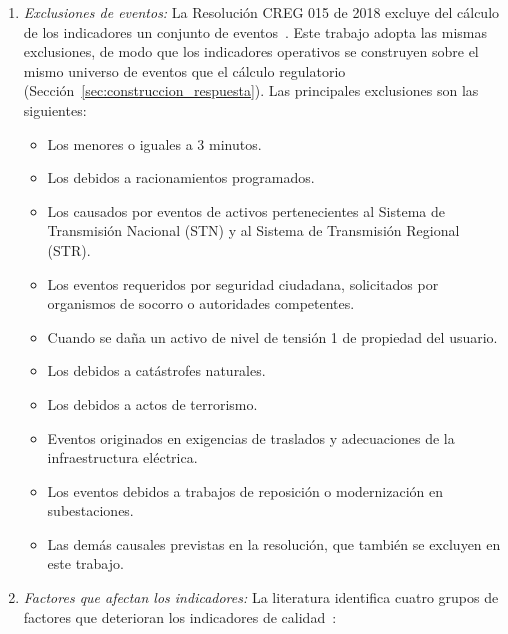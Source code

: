 \begin{enumerate}
          \item \textit{Exclusiones de eventos:}
          La Resolución CREG 015 de 2018 excluye del cálculo de los indicadores un conjunto de eventos~\cite{ref1}. Este trabajo adopta las mismas exclusiones, de modo que los indicadores operativos se construyen sobre el mismo universo de eventos que el cálculo regulatorio (Sección~\ref{sec:construccion_respuesta}). Las principales exclusiones son las siguientes:
            \begin{itemize}
                \item Los menores o iguales a 3 minutos.
                \item Los debidos a racionamientos programados.
                \item Los causados por eventos de activos pertenecientes al Sistema de Transmisión Nacional (STN) y al Sistema de Transmisión Regional (STR).
                \item Los eventos requeridos por seguridad ciudadana, solicitados por organismos de socorro o autoridades competentes.
                \item Cuando se daña un activo de nivel de tensión 1 de propiedad del usuario.
                \item Los debidos a catástrofes naturales.
                \item Los debidos a actos de terrorismo.
                \item Eventos originados en exigencias de traslados y adecuaciones de la infraestructura eléctrica.
                \item Los eventos debidos a trabajos de reposición o modernización en subestaciones.
                \item Las demás causales previstas en la resolución, que también se excluyen en este trabajo.
            \end{itemize}
         
         \item \textit{Factores que afectan los indicadores:}
         La literatura identifica cuatro grupos de factores que deterioran los indicadores de calidad~\cite{ref6,ref7,ref43}:
         

\end{enumerate}
